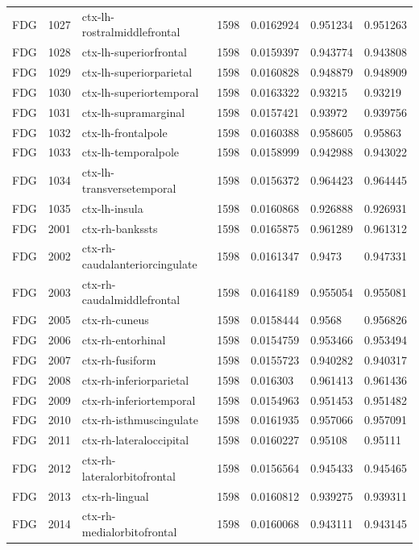 \begin{landscape}
\begin{longtable}{lllllll}
FDG & 1027 & ctx-lh-rostralmiddlefrontal & 1598 & 0.0162924 & 0.951234 & 0.951263 \\
FDG & 1028 & ctx-lh-superiorfrontal & 1598 & 0.0159397 & 0.943774 & 0.943808 \\
FDG & 1029 & ctx-lh-superiorparietal & 1598 & 0.0160828 & 0.948879 & 0.948909 \\
FDG & 1030 & ctx-lh-superiortemporal & 1598 & 0.0163322 & 0.93215 & 0.93219 \\
FDG & 1031 & ctx-lh-supramarginal & 1598 & 0.0157421 & 0.93972 & 0.939756 \\
FDG & 1032 & ctx-lh-frontalpole & 1598 & 0.0160388 & 0.958605 & 0.95863 \\
FDG & 1033 & ctx-lh-temporalpole & 1598 & 0.0158999 & 0.942988 & 0.943022 \\
FDG & 1034 & ctx-lh-transversetemporal & 1598 & 0.0156372 & 0.964423 & 0.964445 \\
FDG & 1035 & ctx-lh-insula & 1598 & 0.0160868 & 0.926888 & 0.926931 \\
FDG & 2001 & ctx-rh-bankssts & 1598 & 0.0165875 & 0.961289 & 0.961312 \\
FDG & 2002 & ctx-rh-caudalanteriorcingulate & 1598 & 0.0161347 & 0.9473 & 0.947331 \\
FDG & 2003 & ctx-rh-caudalmiddlefrontal & 1598 & 0.0164189 & 0.955054 & 0.955081 \\
FDG & 2005 & ctx-rh-cuneus & 1598 & 0.0158444 & 0.9568 & 0.956826 \\
FDG & 2006 & ctx-rh-entorhinal & 1598 & 0.0154759 & 0.953466 & 0.953494 \\
FDG & 2007 & ctx-rh-fusiform & 1598 & 0.0155723 & 0.940282 & 0.940317 \\
FDG & 2008 & ctx-rh-inferiorparietal & 1598 & 0.016303 & 0.961413 & 0.961436 \\
FDG & 2009 & ctx-rh-inferiortemporal & 1598 & 0.0154963 & 0.951453 & 0.951482 \\
FDG & 2010 & ctx-rh-isthmuscingulate & 1598 & 0.0161935 & 0.957066 & 0.957091 \\
FDG & 2011 & ctx-rh-lateraloccipital & 1598 & 0.0160227 & 0.95108 & 0.95111 \\
FDG & 2012 & ctx-rh-lateralorbitofrontal & 1598 & 0.0156564 & 0.945433 & 0.945465 \\
FDG & 2013 & ctx-rh-lingual & 1598 & 0.0160812 & 0.939275 & 0.939311 \\
FDG & 2014 & ctx-rh-medialorbitofrontal & 1598 & 0.0160068 & 0.943111 & 0.943145 \\

\end{longtable}
\end{landscape}
